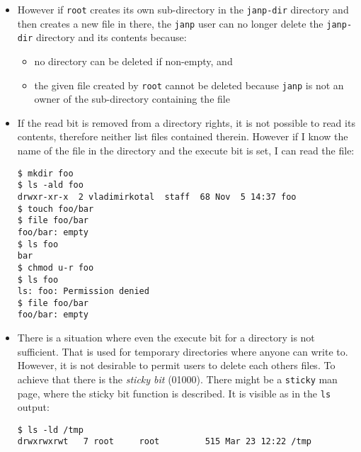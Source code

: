 \begin{itemize}
\item However if \texttt{root} creates its own sub-directory in the
\texttt{janp-dir} directory and then creates a new file in there, the
\texttt{janp} user can no longer delete the \texttt{janp-dir} directory and its
contents because:
\begin{itemize}
\item no directory can be deleted if non-empty, and
\item the given file created by \texttt{root} cannot be deleted because
\texttt{janp} is not an owner of the sub-directory containing the file
\end{itemize}
\item If the read bit is removed from a directory rights, it is not possible to
read its contents, therefore neither list files contained therein. However if I
know the name of the file in the directory and the execute bit is set, I can
read the file:
\begin{verbatim}
$ mkdir foo
$ ls -ald foo
drwxr-xr-x  2 vladimirkotal  staff  68 Nov  5 14:37 foo
$ touch foo/bar
$ file foo/bar
foo/bar: empty
$ ls foo
bar
$ chmod u-r foo
$ ls foo
ls: foo: Permission denied
$ file foo/bar
foo/bar: empty
\end{verbatim}
\item There is a situation where even the execute bit for a directory is not
sufficient.  That is used for temporary directories where anyone can write to.
However, it is not desirable to permit users to delete each others files.
To achieve that there is the \emph{sticky bit} (01000).  There might be a
\texttt{sticky} man page, where the sticky bit function is described.
It is visible as \texttt{} in the \texttt{ls} output:

\begin{verbatim}
$ ls -ld /tmp
drwxrwxrwt   7 root     root         515 Mar 23 12:22 /tmp
\end{verbatim}
\end{itemize}



